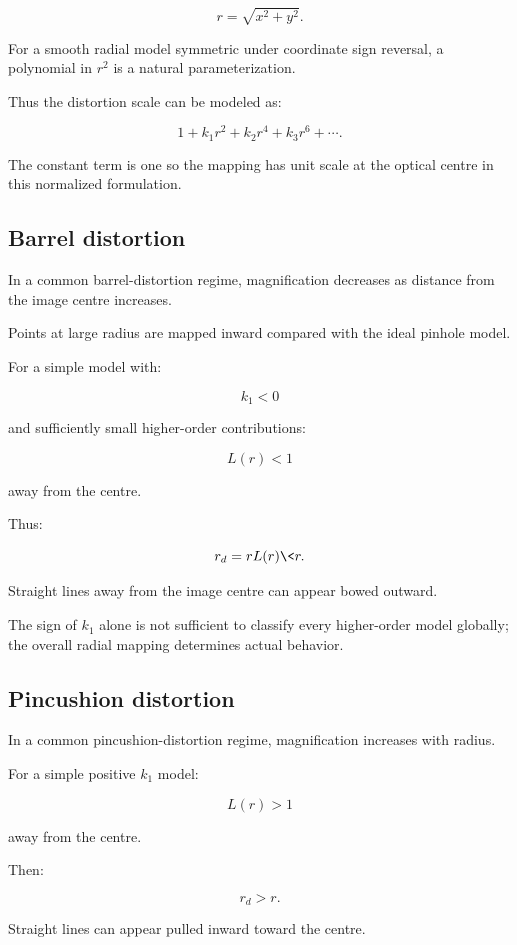 \[
 r=\sqrt{x^2+y^2}.
\]

For a smooth radial model symmetric under coordinate sign reversal, a polynomial in \(r^2\) is a natural parameterization.

Thus the distortion scale can be modeled as:

\[
 1+k_1r^2+k_2r^4+k_3r^6+\cdots.
\]

The constant term is one so the mapping has unit scale at the optical centre in this normalized formulation.

\subsection{Barrel distortion}\label{02-foundations-ii-ch035-barrel-distortion}

In a common barrel-distortion regime, magnification decreases as distance from the image centre increases.

Points at large radius are mapped inward compared with the ideal pinhole model.

For a simple model with:

\[
 k_1<0
\]

and sufficiently small higher-order contributions:

\[
 L(r)<1
\]

away from the centre.

Thus:

\[
 r_d=rL(r)\<r.
\]

Straight lines away from the image centre can appear bowed outward.

The sign of \(k_1\) alone is not sufficient to classify every higher-order model globally; the overall radial mapping determines actual behavior.

\subsection{Pincushion distortion}\label{02-foundations-ii-ch035-pincushion-distortion}

In a common pincushion-distortion regime, magnification increases with radius.

For a simple positive \(k_1\) model:

\[
 L(r)>1
\]

away from the centre.

Then:

\[
 r_d>r.
\]

Straight lines can appear pulled inward toward the centre.

